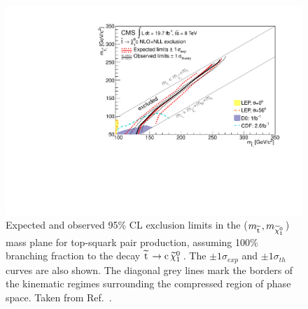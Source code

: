 \begin{figure}[!Hhtb]
  \begin{center}
  \includegraphics[scale=0.39]{Figures/sus13009/limits/limits_stopLSP.pdf}
  \caption{ Expected and observed 95\% CL exclusion limits in the ($m_{\widetilde{{\rm t}}\,}, m_{\widetilde{\chi}^{0}_{1}\,}$) mass plane for top-squark pair production, assuming 100\% branching fraction to the decay $\widetilde{{\rm t}}\, \rightarrow {\rm c}\, \widetilde{\chi}^{0}_{1}\,$. The $\pm1\sigma_{exp}$ and $\pm1\sigma_{th}$ curves are also shown. The diagonal grey lines mark the borders of the kinematic regimes surrounding the compressed region of phase space. 
  Taken from Ref.~\cite{sus13009}.}
  \label{fig:stop_limits_2D}
  \end{center}
\end{figure}



